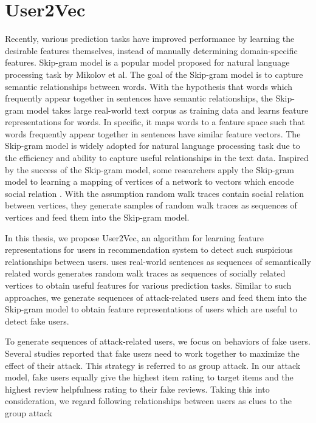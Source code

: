 \documentclass[master,english,final]{kaist-ucs}
\begin{document}
\section{User2Vec}
Recently, various prediction tasks \cite{Word2Vec,NegativeSampling,DeepWalk,Node2Vec} have improved performance by learning the desirable features themselves, instead of manually determining domain-specific features.
Skip-gram model \cite{Word2Vec} is a popular model proposed for natural language processing task by Mikolov et al.
The goal of the Skip-gram model is to capture semantic relationships between words.
With the hypothesis that words which frequently appear together in sentences have semantic relationships, the Skip-gram model takes large real-world text corpus as training data and learns feature representations for words.
In specific, it maps words to a feature space such that words frequently appear together in sentences have similar feature vectors.
The Skip-gram model is widely adopted for natural language processing task due to the efficiency and ability to capture useful relationships in the text data.
Inspired by the success of the Skip-gram model, some researchers apply the Skip-gram model to learning a mapping of vertices of a network to vectors which encode social relation \cite{DeepWalk,Node2Vec}.
With the assumption random walk traces contain social relation between vertices, they generate samples of random walk traces as sequences of vertices and feed them into the Skip-gram model.

In this thesis, we propose User2Vec, an algorithm for learning feature representations for users in recommendation system to detect such suspicious relationships between users.
\cite{Word2Vec} uses real-world sentences as sequences of semantically related words \cite{DeepWalk,Node2Vec} generates random walk traces as sequences of socially related vertices to obtain useful features for various prediction tasks.
Similar to such approaches, we generate sequences of attack-related users and feed them into the Skip-gram model to obtain feature representations of users which are useful to detect fake users.

To generate sequences of attack-related users, we focus on behaviors of fake users.
Several studies \cite{LiesAndPropaganda,UnsupervisedShilling} reported that fake users need to work together to maximize the effect of their attack.
This strategy is referred to as group attack.
In our attack model, fake users equally give the highest item rating to target items and the highest review helpfulness rating to their fake reviews.
Taking this into consideration, we regard following relationships between users as clues to the group attack
\end{document}
